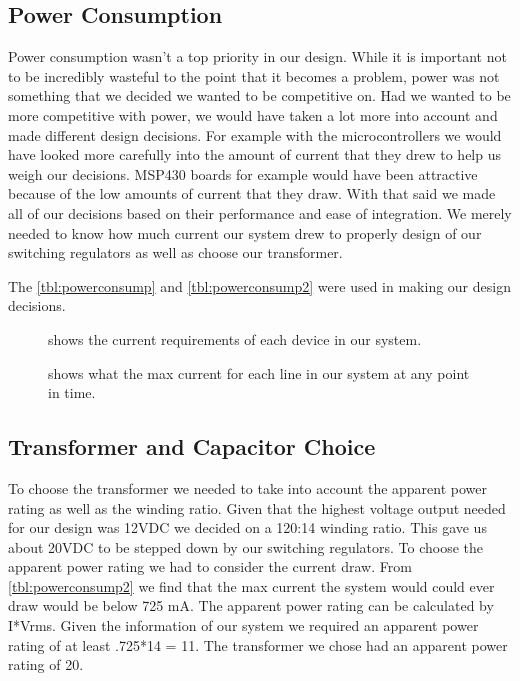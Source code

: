 \documentclass[draft,twocolumn,letterpaper,10pt]{IEEEtran}
\newcommand{\ucffig}[3]{
\begin{figure}[h]
\centering
\makebox[\linewidth][c]{
#2
}
\caption{#3}
\label{#1}
\end{figure}
}
\newcommand{\ucfgfx}[4][scale=1.0]{
\ucffig{#2}{\texttt{[image: \#3]}}{#4}
}
\begin{document}

\subsection{Power Consumption}
\label{sec:power-consumption}
Power consumption wasn{}'t a top priority in our design. While it is important
not to be incredibly wasteful to the point that it becomes a problem, power was
not something that we decided we wanted to be competitive on. Had we wanted to
be more competitive with power, we would have taken a lot more into account and
made different design decisions. For example with the microcontrollers we would
have looked more carefully into the amount of current that they drew to help us
weigh our decisions. MSP430 boards for example would have been attractive
because of the low amounts of current that they draw. With that said we made
all of our decisions based on their performance and ease of integration. We
merely needed to know how much current our system drew to properly design of
our switching regulators as well as choose our transformer.

The \autoref{tbl:powerconsump} and \autoref{tbl:powerconsump2} were used in making our design decisions.

\ucfgfx[width=0.8\linewidth]{tbl:powerconsump}{Powerconsump-img001.png}{shows the current requirements of each device in our system.}

\ucfgfx[width=0.54\linewidth]{tbl:powerconsump2}{Powerconsump-img002.png}{shows what the max current for each line in our system at any point in time.}

\subsection{Transformer and Capacitor Choice}
To choose the transformer we needed to take into account the apparent power
rating as well as the winding ratio. Given that the highest voltage output
needed for our design was 12VDC we decided on a 120:14 winding ratio. This gave
us about 20VDC to be stepped down by our switching regulators. To choose the
apparent power rating we had to consider the current draw. From
\autoref{tbl:powerconsump2} we find that the max current the system would could ever
draw would be below 725 mA. The apparent power rating can be calculated by
I*Vrms. Given the information of our system we required an apparent power
rating of at least .725*14 = 11. The transformer we chose had an apparent power
rating of 20. 
\end{document}
